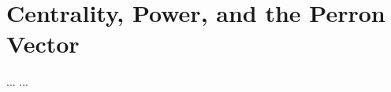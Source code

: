 \documentclass[../solutions_manual.tex]{subfiles}
\begin{document}
\ifSubfilesClassLoaded{\setcounter{chapter}{5}}{}%
\setcounter{chapter}{5}%
\chapter{Centrality, Power, and the Perron Vector}\label{sol06}

 ...
 ...
\end{document}
